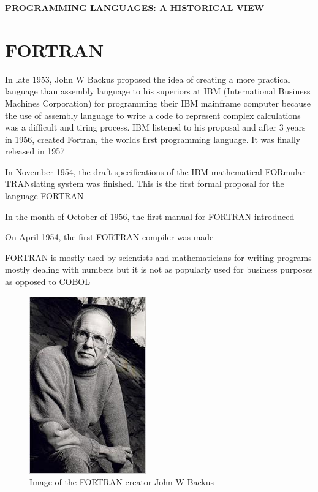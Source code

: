 \documentclass{article}
\begin{document}
	{\underline{\textbf{PROGRAMMING LANGUAGES:{ A HISTORICAL VIEW}}}}\\
	\newpage
	\section{FORTRAN}
	In late 1953, John W Backus proposed the idea of creating a more practical language than assembly language to his superiors at IBM (International Business Machines Corporation) for programming their IBM mainframe computer because the use of assembly language to write a code to represent complex calculations was a difficult and tiring process.
	IBM listened to his proposal and after 3 years in 1956, created Fortran, the worlds first programming language. 
	It was finally released in 1957
	
	\newpage
	In November 1954, the draft specifications of the IBM mathematical FORmular TRANslating system was finished. This is the first formal proposal for the language FORTRAN
	
	In the month of October of 1956, the first manual for FORTRAN introduced 
	
	On April 1954, the first FORTRAN compiler was made
	
	FORTRAN is mostly used by scientists and mathematicians for writing programs mostly dealing with numbers but it is not as popularly used for business purposes as opposed to COBOL\\
\newpage
	\begin{figure}
	\includegraphics[width=0.7\linewidth]{john-w-backus}
	\caption{Image of the FORTRAN creator John W Backus }
	\label{fig:john-w-backus}
\end{figure}
\end{document}
